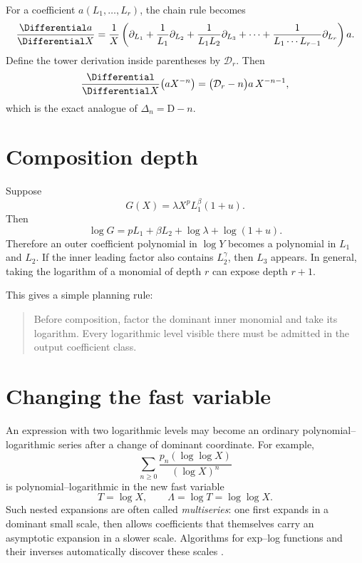 \documentclass[11pt,openany]{book}
\theoremstyle{definition}
\theoremstyle{plain}
\theoremstyle{remark}
\newcommand{\Dop}{\mathrm{D}}
\begin{document}
For a coefficient \(a(L_1,\ldots,L_r)\), the chain rule becomes
\begin{equation}\label{eq:tower-chain-operator}
 \frac{\Differential a}{\Differential X}
 =\frac1X\left(
 \partial_{L_1}
 +\frac1{L_1}\partial_{L_2}
 +\frac1{L_1L_2}\partial_{L_3}
 +\cdots
 +\frac1{L_1\cdots L_{r-1}}\partial_{L_r}
 \right)a.
\end{equation}
Define the tower derivation inside parentheses by \(\mathcal D_r\).  Then
\[
 \frac{\Differential}{\Differential X}\bigl(aX^{-n}\bigr)
 =\bigl(\mathcal D_r-n\bigr)a\,X^{-n-1},
\]
which is the exact analogue of \(\Delta_n=\Dop-n\).

\section{Composition depth}
Suppose
\[
 G(X)=\lambda X^pL_1^\beta(1+u).
\]
Then
\[
 \log G=pL_1+\beta L_2+\log\lambda+\log(1+u).
\]
Therefore an outer coefficient polynomial in \(\log Y\) becomes a polynomial in
\(L_1\) and \(L_2\).  If the inner leading factor also contains \(L_2^\gamma\),
then \(L_3\) appears.  In general, taking the logarithm of a monomial of depth
\(r\) can expose depth \(r+1\).

This gives a simple planning rule:
\begin{quote}
Before composition, factor the dominant inner monomial and take its logarithm.
Every logarithmic level visible there must be admitted in the output
coefficient class.
\end{quote}

\section{Changing the fast variable}
An expression with two logarithmic levels may become an ordinary
polynomial--logarithmic series after a change of dominant coordinate.  For
example,
\begin{equation}\label{eq:multiseries-form}
 \sum_{n\ge0}\frac{p_n(\log\log X)}{(\log X)^n}
\end{equation}
is polynomial--logarithmic in the new fast variable
\[
 T=\log X,
 \qquad \Lambda=\log T=\log\log X.
\]
Such nested expansions are often called \emph{multiseries}: one first expands
in a dominant small scale, then allows coefficients that themselves carry an
asymptotic expansion in a slower scale.  Algorithms for exp--log functions and
their inverses automatically discover these scales
\cite{rssv-exp-log,salvy-shackell}.
\end{document}
